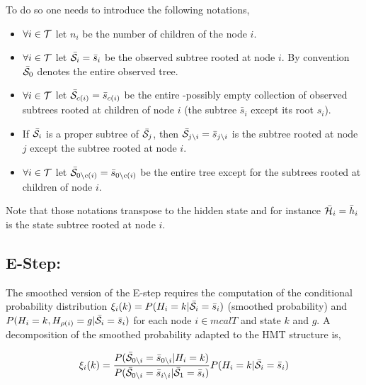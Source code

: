 \documentclass[a4paper,11pt]{report}
\begin{document}
    To do so one needs to introduce the following notations,
    \begin{itemize}
			\item $\forall i \in \mathcal{T}$ let $n_{i}$ be the number of children of the node $i$.
      \item $\forall i \in \mathcal{T}$ let $\bar{\mathcal{S}}_{i}= \bar{s}_{i}$ be the observed subtree rooted at node $i$. By convention $\bar{\mathcal{S}}_{0}$ denotes the entire observed tree.
      \item $\forall i \in \mathcal{T}$ let $\bar{\mathcal{S}}_{c(i)}= \bar{s}_{c(i)}$ be the entire -possibly empty collection of observed subtrees rooted at children of node $i$ (\ie the subtree $\bar{s}_{i}$ except its root $s_{i}$).
      \item If $\bar{\mathcal{S}}_{i}$ is a proper subtree of $\bar{\mathcal{S}}_{j}$, then $\bar{\mathcal{S}}_{j\backslash i} = \bar{s}_{j\backslash i}$ is the subtree rooted at node $j$ except the subtree rooted at node $i$.
      \item $\forall i \in \mathcal{T}$ let $\bar{\mathcal{S}}_{0\backslash c(i)}= \bar{s}_{0\backslash c(i)}$ be the entire tree except for the subtrees rooted at children of node $i$.
    \end{itemize}
    Note that those notations transpose to the hidden state and for instance $\bar{\mathcal{H}}_{i}= \bar{h}_{i}$ is the state subtree rooted at node $i$.\\
    
    \subsection{E-Step:}
			\label{subsec:SHMT/Learning/E}
			The smoothed version of the E-step requires the computation of the conditional probability distribution $\xi_{i}(k) = P(H_{i}=k | \bar{\mathcal{S}}_{i}= \bar{s}_{i})$ (smoothed probability) and $P(H_{i}=k, H_{\rho(i)}=g | \bar{\mathcal{S}}_{i}= \bar{s}_{i})$ for each node $i \in mcalT$ and state $k$ and $g$. A decomposition of the smoothed probability adapted to the HMT structure is,
			
			\begin{equation}
			  \xi_{i}(k) = 
					\frac{P(\bar{\mathcal{S}}_{0\backslash i}= \bar{s}_{0\backslash i} | H_{i}=k)}
						{P(\bar{\mathcal{S}}_{0\backslash i}= \bar{s}_{i\backslash i} | \bar{\mathcal{S}}_{1}= \bar{s}_{i})} 
					P(H_{i}= k |\bar{\mathcal{S}}_{i}= \bar{s}_{i})
				\label{eq:Smoothed P decomposition}
			\end{equation}
			
\end{document}
